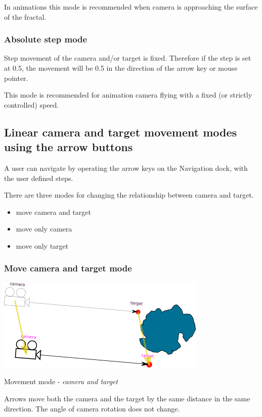 In animations this mode is recommended when camera is approaching the surface of
the fractal.

\subsubsection{Absolute step mode}\label{absolute-step-mode}

Step movement of the camera and/or target is fixed. Therefore if the step is set
at 0.5, the movement will be 0.5 in the direction of the arrow key or mouse
pointer.

This mode is recommended for animation camera flying with a fixed (or strictly
controlled) speed.

\subsection{Linear camera and target movement modes using the arrow
	buttons}\label{linear-camera-and-target-movement-modes-using-the-arrow-buttons}

A user can navigate by operating the arrow keys on the Navigation dock, with the
user defined steps.

There are three modes for changing the relationship between camera and target.
\begin{itemize}
	\item move camera and target
	\item move only camera
	\item move only target
\end{itemize}

\subsubsection{Move camera and target mode}\label{move-camera-and-target-mode}
\nopagebreak

\includegraphics[width=0.5\linewidth]{img/manual/media/move_camera_and_target}
\nopagebreak

Movement mode - \emph{camera and target}
\nopagebreak

Arrows move both the camera and the target by the same distance in the same
direction. The angle of camera rotation does not change.


